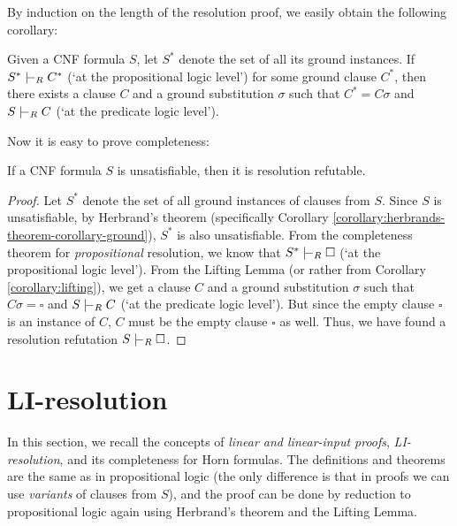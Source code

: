 By induction on the length of the resolution proof, we easily obtain the following corollary:

\begin{corollary}\label{corollary:lifting}
Given a CNF formula $S$, let $S^*$ denote the set of all its ground instances. If $S^*\proves_R C^*$ (`at the propositional logic level') for some ground clause $C^*$, then there exists a clause $C$ and a ground substitution $\sigma$ such that $C^*=C\sigma$ and $S\proves_R C$ (`at the predicate logic level').
\end{corollary}

Now it is easy to prove completeness:

\begin{theorem}\label{theorem:completeness-of-predicate-resolution}
    If a CNF formula $S$ is unsatisfiable, then it is resolution refutable.
\end{theorem}
\begin{proof}
Let $S^*$ denote the set of all ground instances of clauses from $S$. Since $S$ is unsatisfiable, by Herbrand's theorem (specifically Corollary \ref{corollary:herbrands-theorem-corollary-ground}), $S^*$ is also unsatisfiable. From the completeness theorem for \emph{propositional} resolution, we know that $S^*\proves_R\square$ (`at the propositional logic level'). From the Lifting Lemma (or rather from Corollary \ref{corollary:lifting}), we get a clause $C$ and a ground substitution $\sigma$ such that $C\sigma=\square$ and $S\proves_R C$ (`at the predicate logic level'). But since the empty clause $\square$ is an instance of $C$, $C$ must be the empty clause $\square$ as well. Thus, we have found a resolution refutation $S\proves_R \square$.
\end{proof}


\section{LI-resolution}\label{section:predicate-LI-resolution}

In this section, we recall the concepts of \emph{linear and linear-input proofs}, \emph{LI-resolution}, and its completeness for Horn formulas. The definitions and theorems are the same as in propositional logic (the only difference is that in proofs we can use \emph{variants} of clauses from $S$), and the proof can be done by reduction to propositional logic again using Herbrand's theorem and the Lifting Lemma.

